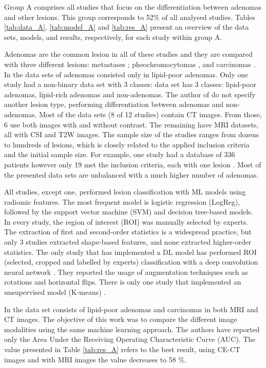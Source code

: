 \documentclass[11pt]{article}
\begin{document}
Group A comprises all studies that focus on the differentiation between adenomas
and other lesions. This group corresponds to 52\% of all analysed studies.
Tables \ref{tab:data_A}, \ref{tab:model_A} and \ref{tab:res_A} present an
overview of the data sets, models, and results, respectively, for each study
within group A.

Adenomas are the common lesion in all of these studies and they are compared
with three different lesions: metastases \cite{Schieda2017,Tu2018,Tu2020};
pheochromocytomas \cite{Yi20181,Yi2018, Liu2022,Liu2021}, and carcinomas
\cite{Elmohr2019, Torresan2021, Ho2019}. In \cite{Tu2020, Yi2018, Yi20181,
Liu2022} the data sets of adenomas consisted only in lipid-poor adenomas. Only
one study had a non-binary data set with 3 classes: \cite{Romeo2018} data set
has 3 classes: lipid-poor adenomas, lipid-rich adenomas and non-adenomas. The
author of \cite{Kusunoki2022} do not specify another lesion type, performing
differentiation between adenomas and non-adenomas. Most of the data sets (8 of
12 studies) contain CT images. From those, 6 use both images with and without
contrast. The remaining have MRI datasets, all with CSI and T2W images. The
sample size of the studies ranges from dozens to hundreds of lesions, which is
closely related to the applied inclusion criteria and the initial sample size.
For example, one study had a database of 336 patients however only 19 met the
inclusion criteria, each with one lesion \cite{Torresan2021}. Most of the
presented data sets are unbalanced with a much higher number of adenomas.

All studies, except one, performed lesion classification
with ML models using radiomic features. The most frequent model is logistic
regression (LogReg), followed by the support vector machine (SVM) and decision
tree-based models. In every study, the region of interest (ROI) was manually
selected by experts. The extraction of first and second-order statistics is a
widespread practice, but only 3 studies extracted shape-based features, and none
extracted higher-order statistics. The only study that has implemented a DL
model has performed ROI (selected, cropped and labelled by experts)
classification with a deep convolution neural network \cite{Kusunoki2022}. They
reported the usage of augmentation techniques such as rotations and horizontal
flips. There is only one study that implemented an unsupervised model (K-means) \cite{Torresan2021}.

In \cite{Ho2019} the data set consists of lipid-poor adenomas and
carcinomas in both MRI and CT images. The objective of this work was to compare
the different image modalities using the same machine learning approach. The
authors have reported only the Area Under the Receiving Operating Characteristic
Curve (AUC). The value presented in Table \ref{tab:res_A} refers to the best result,
using CE-CT images and with MRI images the value decreases to 58 \%.
\end{document}
